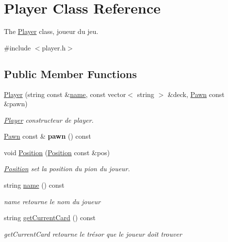 \hypertarget{class_player}{}\section{Player Class Reference}
\label{class_player}


The \mbox{\hyperlink{class_player}{Player}} class, joueur du jeu.  




{\ttfamily \#include $<$player.\+h$>$}

\subsection*{Public Member Functions}
\begin{DoxyCompactItemize}
\item 
\mbox{\hyperlink{class_player_adfc9eb0b7f33b7b4f26a329cf2b88753}{Player}} (string const \&\mbox{\hyperlink{class_player_a6cc57f75295fa8f11f634a2904e9653b}{name}}, const vector$<$ string $>$ \&deck, \mbox{\hyperlink{class_pawn}{Pawn}} const \&pawn)
\begin{DoxyCompactList}\small\item\em \mbox{\hyperlink{class_player}{Player}} constructeur de player. \end{DoxyCompactList}\item 
\mbox{\label{class_player_a02a0f3b789155c97b1f928df420ee6d9}} 
\mbox{\hyperlink{class_pawn}{Pawn}} const  \& {\bfseries pawn} () const
\item 
void \mbox{\hyperlink{class_player_ae7ee566ede118cfe993fd404a3bdca27}{Position}} (\mbox{\hyperlink{class_position}{Position}} const \&pos)
\begin{DoxyCompactList}\small\item\em \mbox{\hyperlink{class_position}{Position}} set la position du pion du joueur. \end{DoxyCompactList}\item 
string \mbox{\hyperlink{class_player_a6cc57f75295fa8f11f634a2904e9653b}{name}} () const
\begin{DoxyCompactList}\small\item\em name retourne le nom du joueur \end{DoxyCompactList}\item 
string \mbox{\hyperlink{class_player_a47b8c4d85179f5ed365d519187de0046}{get\+Current\+Card}} () const
\begin{DoxyCompactList}\small\item\em get\+Current\+Card retourne le trésor que le joueur doit trouver \end{DoxyCompactList}\item 

\end{DoxyCompactItemize}
